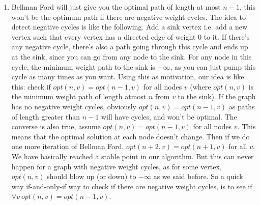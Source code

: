 \documentclass[12pt]{report}
\begin{document}
\begin{enumerate}[label=\textbf{\arabic*.}]
  \item Bellman Ford will just give you the optimal path of length at most $n-1$, this won't be the optimum path if there are negative weight cycles. The idea to detect negative cycles is like the following. Add a sink
  vertex i.e. add a new vertex such that every vertex has a directed edge of weight 0 to it. If there's any negative cycle, there's also a path going through this cycle and ends up at the sink, since you can go from any node to the sink.
  For any node in this cycle, the minimum weight path to the sink is $-\infty$, as you can just pump this cycle as many times as you want. Using this as motivation, our idea is like this: check if $opt(n,v) = opt(n-1,v)$
  for all nodes $v$ (where $opt(n,v)$ is the minimum weight path of length atmost $n$ from $v$ to the sink). If the graph has no negative weight cycles, obviously $opt(n,v) = opt(n-1,v)$ as paths of length greater than $n-1$
  will have cycles, and won't be optimal. The converse is also true, assume $opt(n,v) = opt(n-1,v)$ for all nodes $v$. This means that the optimal solution at each node doesn't change. Then if we do one more iteration of Bellman Ford,
  $opt(n+2, v) = opt(n+1, v)$ for all $v$. We have basically reached a stable point in our algorithm. But this can never happen for a graph with negative weight cycles, as for some vertex, $opt(n,v)$ should blow up (or down) to 
  $-\infty$ as we said before. So a quick way if-and-only-if way to check if there are negative weight cycles, is to see if $\forall v \ opt(n,v) = opt(n-1,v)$.

  \end{enumerate}
\end{document}
